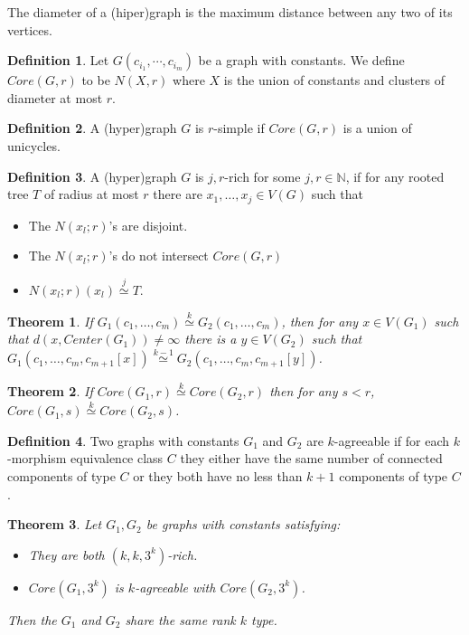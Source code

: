 \documentclass[11pt,notitlepage]{report}
\newtheorem{theorem}{Theorem}[chapter]
\theoremstyle{definition}
\newtheorem{definition}{Definition}[chapter]
\theoremstyle{remark}
\newcommand{\N}{\mathbb{N}}
\newcommand{\clist}{c_{i_1}, \cdots, c_{i_m}}
\newcommand{\morph}[1]{\stackrel{#1}{\simeq}}
\begin{document}
The diameter of a (hiper)graph is the maximum distance between any two of its vertices. 

\begin{definition} 
	Let $G(\clist)$ be a graph with constants. We define $Core(G,r)$ to be
	$N(X,r)$ where $X$ is the union of constants and clusters of diameter at most $r$. 
\end{definition}


\begin{definition} 
	A (hyper)graph $G$ is $r$-simple if $Core(G,r)$ is a union of unicycles. 
\end{definition}

\begin{definition}
	A (hyper)graph $G$ is $j,r$-rich for some $j,r\in \N$, if for any rooted tree $T$
	of radius at most $r$ there are $x_1,\dots,x_j\in V(G)$ such that
	\begin{itemize}
		\item The $N(x_l;r)$'s are disjoint.
		\item The $N(x_l;r)$'s do not intersect $Core(G,r)$
		\item $N(x_l;r)(x_l) \morph{j} T$.		
	\end{itemize} 
\end{definition}


\begin{theorem}
	If $G_1(c_1,\dots,c_m)\morph{k} G_2(c_1,\dots,c_m)$, then for any $x\in V(G_1)$ such 
	that $d(x,Center(G_1))\neq \infty$ there is a $y\in V(G_2)$ such that
	$G_1(c_1,\dots,c_m,c_{m+1}[x])\morph{k-1} G_2(c_1,\dots,c_m,c_{m+1}[y])$.
\end{theorem}

\begin{theorem}
	If $Core(G_1,r)\morph{k} Core(G_2,r)$ then for any $s<r$, $Core(G_1,s)\morph{k} Core(G_2,s)$.
\end{theorem}


\begin{definition} 
	Two graphs with constants $G_1$ and $G_2$ are $k$-agreeable if for each $k$-morphism 
	equivalence class $C$ they either have the same number of connected components of type
	$C$ or they both have no less than $k+1$ components of type $C$. 
\end{definition}


\begin{theorem} 
	Let $G_1, G_2$ be graphs with constants satisfying:
	\begin{itemize}
		\item They are both $(k, k, 3^k)$-rich.
		\item $Core(G_1,3^k)$ is $k$-agreeable with $Core(G_2,3^k)$.
	\end{itemize} 
	Then the $G_1$ and $G_2$ share the same rank $k$ type.
\end{theorem}
\end{document}

